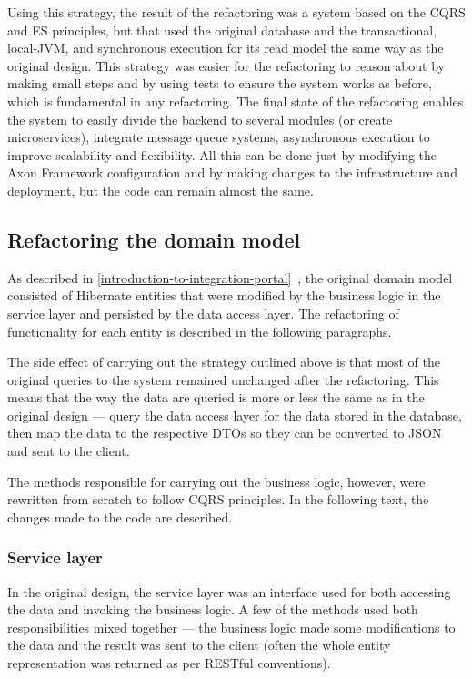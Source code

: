 \documentclass{book}
\begin{document}
Using this strategy, the result of the refactoring was a system based on
the CQRS and ES principles, but that used the original database and the
transactional, local-JVM, and synchronous execution for its read model
the same way as the original design. This strategy was easier for the
refactoring to reason about by making small steps and by using tests to
ensure the system works as before, which is fundamental in any
refactoring. The final state of the refactoring enables the system to
easily divide the backend to several modules (or create microservices),
integrate message queue systems, asynchronous execution to improve
scalability and flexibility. All this can be done just by modifying the
Axon Framework configuration and by making changes to the infrastructure
and deployment, but the code can remain almost the same.


\subsection{Refactoring the domain
model}\label{refactoring-the-domain-model}

As described in \ref{introduction-to-integration-portal}~, the original domain model
consisted of Hibernate entities that were modified by the business logic
in the service layer and persisted by the data access layer. The
refactoring of functionality for each entity is described in the
following paragraphs.

The side effect of carrying out the strategy outlined above is that most
of the original queries to the system remained unchanged after the
refactoring. This means that the way the data are queried is more or
less the same as in the original design --- query the data access layer
for the data stored in the database, then map the data to the respective
DTOs so they can be converted to JSON and sent to the client.

The methods responsible for carrying out the business logic, however,
were rewritten from scratch to follow CQRS principles. In the following
text, the changes made to the code are described.

\subsubsection{Service layer}\label{service-layer}

In the original design, the service layer was an interface used for both
accessing the data and invoking the business logic. A few of the methods
used both responsibilities mixed together --- the business logic made
some modifications to the data and the result was sent to the client
(often the whole entity representation was returned as per RESTful
conventions).
\end{document}
